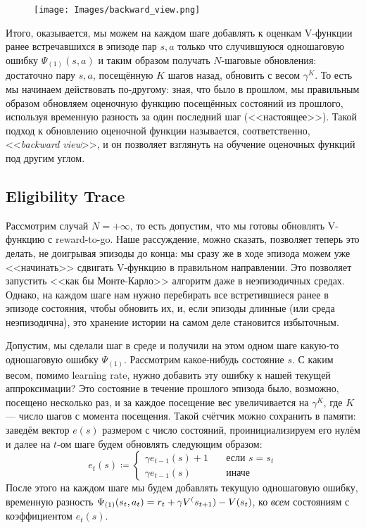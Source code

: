 \begin{wrapfigure}[11]{l}{0.35\textwidth}
\centering
\texttt{[image: Images/backward\_view.png]}
\end{wrapfigure}
Итого, оказывается, мы можем на каждом шаге добавлять к оценкам V-функции ранее встречавшихся в эпизоде пар $s, a$ только что случившуюся одношаговую ошибку $\Psi_{(1)}(s, a)$ и таким образом получать $N$-шаговые обновления: достаточно пару $s, a$, посещённую $K$ шагов назад, обновить с весом $\gamma^K$. То есть мы начинаем действовать по-другому: зная, что было в прошлом, мы правильным образом обновляем оценочную функцию посещённых состояний из прошлого, используя временную разность за один последний шаг (<<настоящее>>). Такой подход к обновлению оценочной функции называется, соответственно, <<\emph{backward view}>>, и он позволяет взглянуть на обучение оценочных функций под другим углом.

\subsection{Eligibility Trace}

Рассмотрим случай $N = +\infty$, то есть допустим, что мы готовы обновлять V-функцию с reward-to-go. Наше рассуждение, можно сказать, позволяет теперь это делать, не доигрывая эпизоды до конца: мы сразу же в ходе эпизода можем уже <<начинать>> сдвигать V-функцию в правильном направлении. Это позволяет запустить <<как бы Монте-Карло>> алгоритм даже в неэпизодичных средах. Однако, на каждом шаге нам нужно перебирать все встретившиеся ранее в эпизоде состояния, чтобы обновить их, и, если эпизоды длинные (или среда неэпизодична), это хранение истории на самом деле становится избыточным. 

Допустим, мы сделали шаг в среде и получили на этом одном шаге какую-то одношаговую ошибку $\Psi_{(1)}$. Рассмотрим какое-нибудь состояние $s$. С каким весом, помимо learning rate, нужно добавить эту ошибку к нашей текущей аппроксимации? Это состояние в течение прошлого эпизода было, возможно, посещено несколько раз, и за каждое посещение вес увеличивается на $\gamma^K$, где $K$ --- число шагов с момента посещения. Такой счётчик можно сохранить в памяти: заведём вектор $e(s)$ размером с число состояний, проинициализируем его нулём и далее на $t$-ом шаге будем обновлять следующим образом:
\begin{equation}\label{montecarloeligibility}
e_t(s) \coloneqq \begin{cases}
\gamma e_{t - 1}(s) + 1 \quad & \text{если } s = s_t \\
\gamma e_{t - 1}(s) \quad & \text{иначе}
\end{cases}
\end{equation}
После этого на каждом шаге мы будем добавлять текущую одношаговую ошибку, временную разность $\Psi_{(1)}(s_t, a_t) \HM= r_t \HM+ \gamma V^(s_{t+1}) \HM- V(s_t)$, ко \textit{всем} состояниям с коэффициентом $e_t(s)$.

